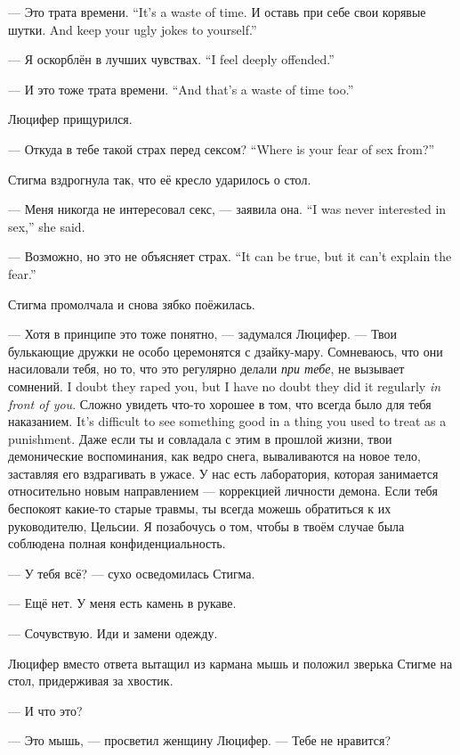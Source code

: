 {--- Это трата времени.}
{``It's a waste of time.}
{И оставь при себе свои корявые шутки.}
{And keep your ugly jokes to yourself.''}

{--- Я оскорблён в лучших чувствах.}
{``I feel deeply offended.''}

{--- И это тоже трата времени.}
{``And that's a waste of time too.''}

Люцифер прищурился.

{--- Откуда в тебе такой страх перед сексом?}
{``Where is your fear of sex from?''}

Стигма вздрогнула так, что её кресло ударилось о стол.

{--- Меня никогда не интересовал секс, --- заявила она.}
{``I was never interested in sex,'' she said.}

{--- Возможно, но это не объясняет страх.}
{``It can be true, but it can't explain the fear.''}

Стигма промолчала и снова зябко поёжилась.

--- Хотя в принципе это тоже понятно, --- задумался Люцифер.
--- Твои булькающие дружки не особо церемонятся с дзайку-мару.
{Сомневаюсь, что они насиловали тебя, но то, что это регулярно делали \emph{при тебе}, не вызывает сомнений.}
{I doubt they raped you, but I have no doubt they did it regularly \emph{in front of you}.}
{Сложно увидеть что-то хорошее в том, что всегда было для тебя наказанием.}
{It's difficult to see something good in a thing you used to treat as a punishment.}
Даже если ты и совладала с этим в прошлой жизни, твои демонические воспоминания, как ведро снега, вываливаются на новое тело, заставляя его вздрагивать в ужасе.
У нас есть лаборатория, которая занимается относительно новым направлением --- коррекцией личности демона.
Если тебя беспокоят какие-то старые травмы, ты всегда можешь обратиться к их руководителю, Цельсии.
Я позабочусь о том, чтобы в твоём случае была соблюдена полная конфиденциальность.

--- У тебя всё? --- сухо осведомилась Стигма.

--- Ещё нет.
У меня есть камень в рукаве.

--- Сочувствую.
Иди и замени одежду.

Люцифер вместо ответа вытащил из кармана мышь и положил зверька Стигме на стол, придерживая за хвостик.

--- И что это?

--- Это мышь, --- просветил женщину Люцифер.
--- Тебе не нравится?

